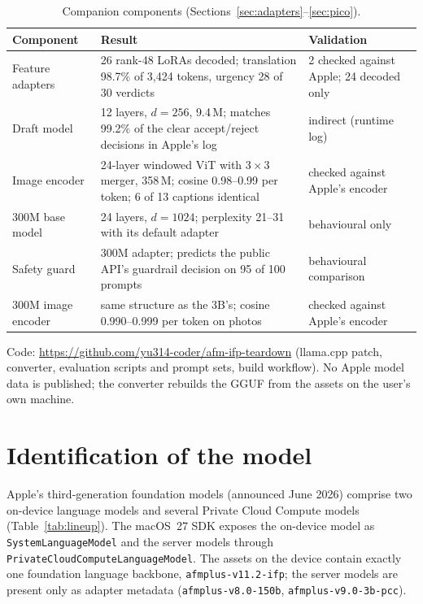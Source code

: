 \documentclass[11pt,reqno]{amsart}
\newcommand{\code}[1]{\texttt{#1}}
\theoremstyle{definition}
\begin{document}
\begin{table}[!htbp]
\centering\small
\begin{tabular}{@{}p{27mm}p{84mm}p{43mm}@{}}
\toprule
Component & Result & Validation \\
\midrule
Feature adapters & 26 rank-48 LoRAs decoded; translation 98.7\% of 3{,}424 tokens, urgency 28 of 30 verdicts & 2 checked against Apple; 24 decoded only \\
Draft model & 12 layers, $d=256$, 9.4\,M; matches 99.2\% of the clear accept/reject decisions in Apple's log & indirect (runtime log) \\
Image encoder & 24-layer windowed ViT with $3\times3$ merger, 358\,M; cosine 0.98--0.99 per token; 6 of 13 captions identical & checked against Apple's encoder \\
300M base model & 24 layers, $d=1024$; perplexity 21--31 with its default adapter & behavioural only \\
Safety guard & 300M adapter; predicts the public API's guardrail decision on 95 of 100 prompts & behavioural comparison \\
300M image encoder & same structure as the 3B's; cosine 0.990--0.999 per token on photos & checked against Apple's encoder \\
\bottomrule
\end{tabular}
\caption{Companion components (Sections~\ref{sec:adapters}--\ref{sec:pico}).}\label{tab:companion}
\end{table}

\noindent Code: \url{https://github.com/yu314-coder/afm-ifp-teardown} (llama.cpp patch, converter, evaluation scripts and prompt sets, build workflow). No Apple model data is published; the converter rebuilds the GGUF from the assets on the user's own machine.

\section{Identification of the model}\label{sec:which}

Apple's third-generation foundation models (announced June 2026) comprise two on-device language models and several Private Cloud Compute models (Table~\ref{tab:lineup}). The macOS~27 SDK exposes the on-device model as \code{SystemLanguageModel} and the server models through \code{PrivateCloudComputeLanguageModel}. The assets on the device contain exactly one foundation language backbone, \code{afmplus-v11.2-ifp}; the server models are present only as adapter metadata (\code{afmplus-v8.0-150b}, \code{afmplus-v9.0-3b-pcc}).
\end{document}
